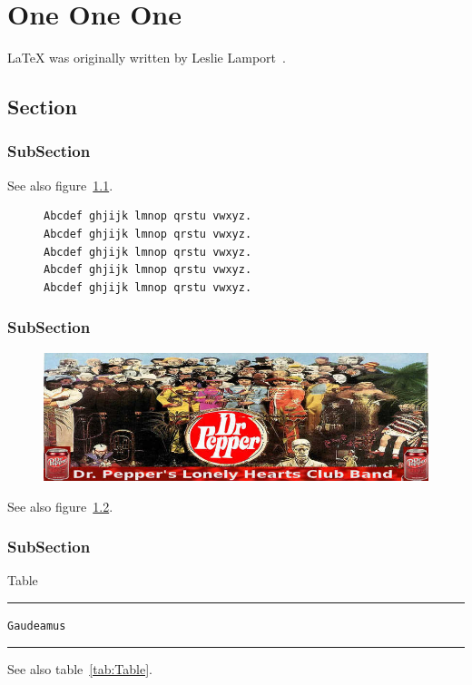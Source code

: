 

\chapter{One One One}
\LaTeX{} was originally written by Leslie Lamport~\cite{manual}.
\gaudeamus
\section{Section}
\lipsum[1]
\subsection{SubSection}
\lipsum[1]
See also figure~\ref{document}.
\begin{figure}[h]
\begin{verbatim}
Abcdef ghjijk lmnop qrstu vwxyz.
Abcdef ghjijk lmnop qrstu vwxyz.
Abcdef ghjijk lmnop qrstu vwxyz.
Abcdef ghjijk lmnop qrstu vwxyz.
Abcdef ghjijk lmnop qrstu vwxyz.
\end{verbatim}
\caption[FIG LIST AAAAA]{\gaudeamus}\label{document}
\end{figure}
\subsection{SubSection}
\lipsum[1]
\begin{figure}[h]
\begin{center}
\vspace*{9pt}
\includegraphics[scale=0.25]{book.jpg}
\vspace*{7pt}
\end{center}
\caption[FIG LIST BBBBB]{\gaudeamus}\label{fig:figure}
\end{figure}
\lipsum[1]
See also figure~\ref{fig:figure}.
\subsection{SubSection}
\lipsum[1]
\begin{table}[h]
\caption{Table} \label{tab:Table}
\hrule
\begin{description}
\item [\normalfont\texttt{Gaudeamus}] \gaudeamus
\end{description}
\hrule
\end{table}
\lipsum[1]
See also table~\ref{tab:Table}.

